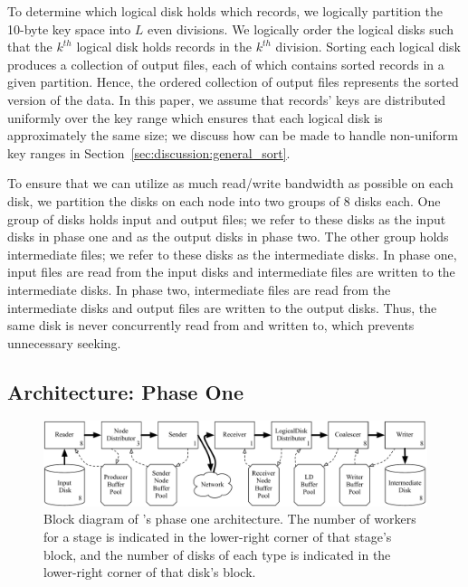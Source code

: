 To determine which logical disk holds which records, we logically partition the
10-byte key space into $L$ even divisions.  We logically order the logical
disks such that the $k^{th}$ logical disk holds records in the $k^{th}$
division.  Sorting each logical disk produces a collection of output files,
each of which contains sorted records in a given partition.  Hence, the ordered
collection of output files represents the sorted version of the data.  In this
paper, we assume that records' keys are distributed uniformly over the key range
which ensures that each logical disk is approximately the same size; we discuss
how \tritonsort can be made to handle non-uniform key ranges in
Section~\ref{sec:discussion:general_sort}.

To ensure that we can utilize as much read/write bandwidth as possible on each
disk, we partition the disks on each node into two groups of 8 disks each. One
group of disks holds input and output files; we refer to these disks as the
input disks in phase one and as the output disks in phase two.  The other group
holds intermediate files; we refer to these disks as the intermediate disks.
In phase one, input files are read from the input disks and intermediate files
are written to the intermediate disks. In phase two, intermediate files are
read from the intermediate disks and output files are written to the output
disks. Thus, the same disk is never concurrently read from and written to,
which prevents unnecessary seeking.

\subsection{\tritonsort Architecture: Phase One}

\begin{figure}
  \centering \includegraphics[width=\textwidth]{tritonsort/figs/phase1.pdf}

  \caption{ Block diagram of \tritonsort's phase one architecture.  The
    number of workers for a stage is indicated in the lower-right corner of
    that stage's block, and the number of disks of each type is indicated in
    the lower-right corner of that disk's block.}

  \label{fig:phase1}
\end{figure}

